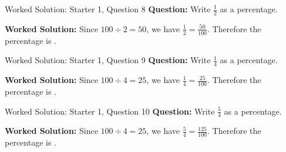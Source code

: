 \documentclass{beamer}
\newcommand{\ablank}[1]{%
  \alt<2>{\textcolor{red}{#1}}{\underline{\phantom{#1}}}%
}
\begin{document}
\begin{frame}[t]{Worked Solution: Starter 1, Question 8}
\textbf{Question:} Write \(\frac{1}{2}\) as a percentage.

\smallskip
\textbf{Worked Solution:} Since \(100 \div 2 = 50\), we have \(\frac{1}{2} = \frac{50}{100}\). Therefore the percentage is \ablank{$50\%$}.
\end{frame}

\begin{frame}[t]{Worked Solution: Starter 1, Question 9}
\textbf{Question:} Write \(\frac{1}{4}\) as a percentage.

\smallskip
\textbf{Worked Solution:} Since \(100 \div 4 = 25\), we have \(\frac{1}{4} = \frac{25}{100}\). Therefore the percentage is \ablank{$25\%$}.
\end{frame}

\begin{frame}[t]{Worked Solution: Starter 1, Question 10}
\textbf{Question:} Write \(\frac{5}{4}\) as a percentage.

\smallskip
\textbf{Worked Solution:} Since \(100 \div 4 = 25\), we have \(\frac{5}{4} = \frac{125}{100}\). Therefore the percentage is \ablank{$125\%$}.
\end{frame}
\end{document}
